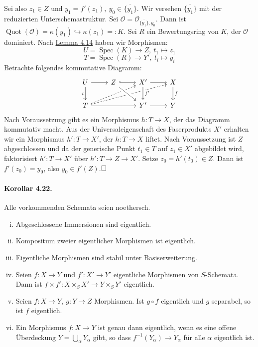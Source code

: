 \documentclass[11pt,b5paper,openany]{memoir}
\def \qed {$\hfill\square$}
\begin{document}
\begin{itemize}
Sei also $z_1\in Z$ und $y_1=f'(z_1),\ y_0\in\overline{\{y_1\}}$. Wir versehen $\overline{\{y_1\}}$ mit der reduzierten Unterschemastruktur. Sei $\mathcal{O}=\mathcal{O}_{\overline{\{y_1\}},y_0 }$. Dann ist $\operatorname{Quot}(\mathcal{O})=\kappa(y_1)\hookrightarrow \kappa(z_1)=:K$.  Sei $R$ ein Bewertungsring von $K$, der $\mathcal{O}$ dominiert. Nach \hyperref[4.14]{Lemma 4.14} haben wir Morphismen:
\[U=\operatorname{Spec}(K)\to Z,\ t_1\mapsto z_1 \]
\[T=\operatorname{Spec}(R)\to Y',\ t_i\mapsto y_i \]
Betrachte folgendes kommutative Diagramm:
\[\begin{tikzcd}
U\ar[r] \ar[d, "i"'] & Z\ar[r, hook] & X'\ar[r]& X\ar[d, "f"]\\
T\ar[rr]\ar[rrru, dashed]\ar[rru, dashed] & & Y'\ar[r]\ar[from=u, "f'", crossing over]\ar[from=ul, crossing over] & Y
\end{tikzcd} \]
Nach Voraussetzung gibt es ein Morphismus $h:T\to X$, der das Diagramm kommutativ macht. Aus der Universaleigenschaft des Faserprodukts $X'$ erhalten wir ein Morphismus $h':T\to X'$, der $h:T\to X$ liftet. Nach Voraussetzung ist $Z$ abgeschlossen und da der generische Punkt $t_1\in T$ auf $z_1\in X'$ abgebildet wird, faktorisiert $h':T\to X'$ über $h':T\to Z\to X'$. Setze $z_0=h'(t_0)\in Z$. Dann ist $f'(z_0)=y_0$, also $y_0\in f'(Z)$.\qed
\end{itemize}

\paragraph{Korollar 4.22.}\label{4.22} Alle vorkommenden Schemata seien noethersch. \begin{enumerate}[(i)]
\item Abgeschlossene Immersionen sind eigentlich.
\item Kompositum zweier eigentlicher Morphismen ist eigentlich.
\item Eigentliche Morphismen sind stabil unter Basiserweiterung.
\item Seien $f:X\to Y$ und $f':X'\to Y'$ eigentliche Morphismen von $S$-Schemata. Dann ist $f\times f':X\times_SX'\to Y\times_SY'$ eigentlich.
\item Seien $f:X\to Y,\ g:Y\to Z$ Morphismen. Ist $g\circ f$ eigentlich und $g$ separabel, so ist $f$ eigentlich.
\item Ein Morphismus $f:X\to Y$ ist genau dann eigentlich, wenn es eine offene Ü\-ber\-deckung $Y=\bigcup_\alpha Y_\alpha$ gibt, so dass $f^{-1}(Y_\alpha)\to Y_\alpha$ für alle $\alpha$ eigentlich ist.
\end{enumerate}
\end{document}
